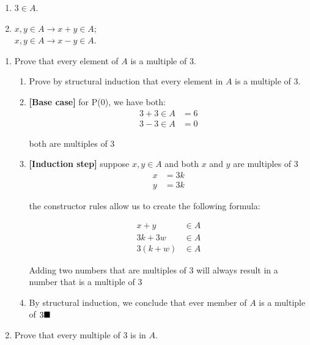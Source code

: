 \documentclass{article}
\begin{document}
\begin{itemize}
        \begin{enumerate}[label=\arabic*.]
            \item $3 \in A$.
            \item $x,y \in A \rightarrow x + y \in A$;\\
            $x,y \in A \rightarrow x-y \in A$.
        \end{enumerate}
        \begin{enumerate}[label=(\alph*)]
            \item Prove that every element of $A$ is a multiple of 3.
            \begin{enumerate}[label=\arabic*.]
                \item Prove by structural induction that every element in $A$ is a multiple of $3$.
                \item \textbf{[Base case]} for P(0), we have both:
                \begin{align*}
                    3 + 3 \in A &= 6\\
                    3 - 3 \in A &= 0
                \end{align*}
                \begin{center}
                    both are multiples of 3
                \end{center}
                \item \textbf{[Induction step]} suppose $x, y \in A$ and both $x$ and $y$ are multiples of 3
                \begin{align*}
                    x &= 3k\\
                    y &= 3k
                \end{align*}
                \begin{center}
                    the constructor rules allow us to create the following formula:
                \end{center}
                \begin{align*}
                    x + y &\in A\\
                    3k + 3w &\in A\\
                    3(k+w) &\in A
                \end{align*}
                \begin{center}
                    Adding two numbers that are multiples of 3 will always result in a number that is a multiple of 3
                \end{center}
                \item By structural induction, we conclude that ever member of $A$ is a multiple of $3\hfill\blacksquare$
            \end{enumerate}
            \item Prove that every multiple of 3 is in $A$.
        \end{enumerate}
    \end{itemize}
    
\end{document}
